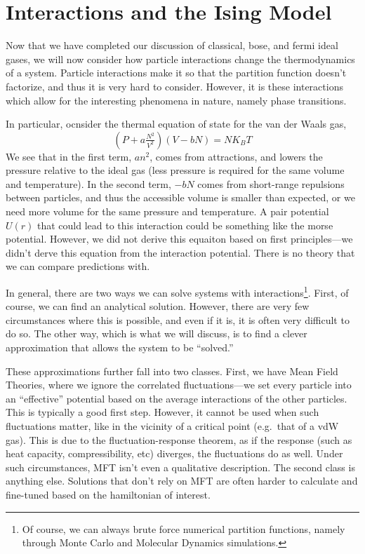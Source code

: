 \chapter{Interactions and the Ising Model}
Now that we have completed our discussion of classical, bose, and fermi ideal gases, we will now consider how particle interactions change the thermodynamics of a system. Particle interactions make it so that the partition function doesn't factorize, and thus it is very hard to consider. However, it is these interactions which allow for the interesting phenomena in nature, namely phase transitions.

In particular, ocnsider the thermal equation of state for the van der Waals gas,
\[\left(P+a\tfrac{N^2}{V^2}\right)(V-bN) = NK_BT\]
We see that in the first term, \(an^2\), comes from attractions, and lowers the pressure relative to the ideal gas (less pressure is required for the same volume and temperature). In the second term, \(-bN\) comes from short-range repulsions between particles, and thus the accessible volume is smaller than expected, or we need more volume for the same pressure and temperature. A pair potential \(U(r)\) that could lead to this interaction could be something like the morse potential. However, we did not derive this equaiton based on first principles---we didn't derve this equation from the interaction potential. There is no theory that we can compare predictions with.

In general, there are two ways we can solve systems with interactions\footnote{Of course, we can always brute force numerical partition functions, namely through Monte Carlo and Molecular Dynamics simulations.}. First, of course, we can find an analytical solution. However, there are very few circumstances where this is possible, and even if it is, it is often very difficult to do so. The other way, which is what we will discuss, is to find a clever approximation that allows the system to be ``solved.'' 

These approximations further fall into two classes. First, we have Mean Field Theories, where we ignore the correlated fluctuations---we set every particle into an ``effective'' potential based on the average interactions of the other particles. This is typically a good first step. However, it cannot be used when such fluctuations matter, like in the vicinity of a critical point (e.g.\ that of a vdW gas). This is due to the fluctuation-response theorem, as if the response (such as heat capacity, compressibility, etc) diverges, the fluctuations do as well. Under such circumstances, MFT isn't even a qualitative description. The second class is anything else. Solutions that don't rely on MFT are often harder to calculate and fine-tuned based on the hamiltonian of interest.


